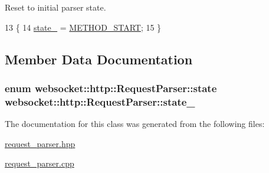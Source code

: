 Reset to initial parser state. 


\begin{DoxyCode}
13         \{
14             \hyperlink{classwebsocket_1_1http_1_1RequestParser_aed48589d041848aabcd27672a0a4ad73}{state\_} = \hyperlink{classwebsocket_1_1http_1_1RequestParser_af1ad2d57d234f4ac8fb9d9656bd9c8b2a40f2ae25565541dc821c917c7b4e92f5}{METHOD\_START};
15         \}
\end{DoxyCode}


\subsection{Member Data Documentation}
\subsubsection[{\texorpdfstring{state\+\_\+}{state_}}]{\setlength{\rightskip}{0pt plus 5cm}enum {\bf websocket\+::http\+::\+Request\+Parser\+::state}  websocket\+::http\+::\+Request\+Parser\+::state\+\_\+\hspace{0.3cm}{\ttfamily [private]}}\hypertarget{classwebsocket_1_1http_1_1RequestParser_aed48589d041848aabcd27672a0a4ad73}{}\label{classwebsocket_1_1http_1_1RequestParser_aed48589d041848aabcd27672a0a4ad73}


The documentation for this class was generated from the following files\+:\begin{DoxyCompactItemize}
\item 
\hyperlink{request__parser_8hpp}{request\+\_\+parser.\+hpp}\item 
\hyperlink{request__parser_8cpp}{request\+\_\+parser.\+cpp}\end{DoxyCompactItemize}
